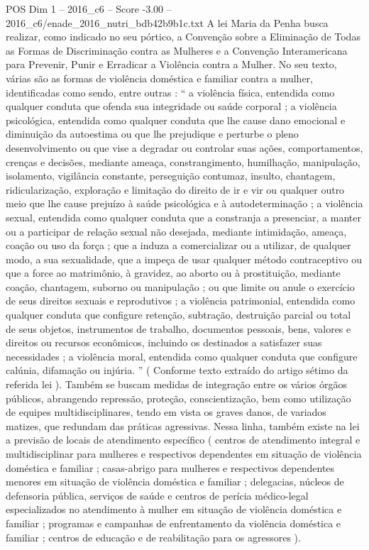 \begin{textsample}{POS Dim 1 – 2016\_c6 – Score -3.00 – 2016\_c6/enade\_2016\_nutri\_bdb42b9b1c.txt}
A lei Maria da Penha busca realizar, como indicado no seu pórtico, a Convenção sobre a Eliminação de Todas as Formas de Discriminação contra as Mulheres e a Convenção Interamericana para Prevenir, Punir e Erradicar a Violência contra a Mulher.
No seu texto, várias são as formas de violência doméstica e familiar contra a mulher, identificadas como sendo, entre outras : “ a violência física, entendida como qualquer conduta que ofenda sua integridade ou saúde corporal ; a violência psicológica, entendida como qualquer conduta que lhe cause dano emocional e diminuição da autoestima ou que lhe prejudique e perturbe o pleno desenvolvimento ou que vise a degradar ou controlar suas ações, comportamentos, crenças e decisões, mediante ameaça, constrangimento, humilhação, manipulação, isolamento, vigilância constante, perseguição contumaz, insulto, chantagem, ridicularização, exploração e limitação do direito de ir e vir ou qualquer outro meio que lhe cause prejuízo à saúde psicológica e à autodeterminação ; a violência sexual, entendida como qualquer conduta que a constranja a presenciar, a manter ou a participar de relação sexual não desejada, mediante intimidação, ameaça, coação ou uso da força ; que a induza a comercializar ou a utilizar, de qualquer modo, a sua sexualidade, que a impeça de usar qualquer método contraceptivo ou que a force ao matrimônio, à gravidez, ao aborto ou à prostituição, mediante coação, chantagem, suborno ou manipulação ; ou que limite ou anule o exercício de seus direitos sexuais e reprodutivos ; a violência patrimonial, entendida como qualquer conduta que configure retenção, subtração, destruição parcial ou total de seus objetos, instrumentos de trabalho, documentos pessoais, bens, valores e direitos ou recursos econômicos, incluindo os destinados a satisfazer suas necessidades ; a violência moral, entendida como qualquer conduta que configure calúnia, difamação ou injúria. ” ( Conforme texto extraído do artigo sétimo da referida lei ).
Também se buscam medidas de integração entre os vários órgãos públicos, abrangendo repressão, proteção, conscientização, bem como utilização de equipes multidisciplinares, tendo em vista os graves danos, de variados matizes, que redundam das práticas agressivas.
Nessa linha, também existe na lei a previsão de locais de atendimento específico ( centros de atendimento integral e multidisciplinar para mulheres e respectivos dependentes em situação de violência doméstica e familiar ; casas-abrigo para mulheres e respectivos dependentes menores em situação de violência doméstica e familiar ; delegacias, núcleos de defensoria pública, serviços de saúde e centros de perícia médico-legal especializados no atendimento à mulher em situação de violência doméstica e familiar ; programas e campanhas de enfrentamento da violência doméstica e familiar ; centros de educação e de reabilitação para os agressores ).

\end{textsample}

